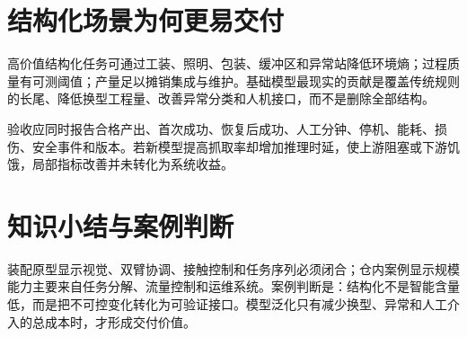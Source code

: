 \section{结构化场景为何更易交付}

高价值结构化任务可通过工装、照明、包装、缓冲区和异常站降低环境熵；过程质量有可测阈值；产量足以摊销集成与维护。基础模型最现实的贡献是覆盖传统规则的长尾、降低换型工程量、改善异常分类和人机接口，而不是删除全部结构。

验收应同时报告合格产出、首次成功、恢复后成功、人工分钟、停机、能耗、损伤、安全事件和版本。若新模型提高抓取率却增加推理时延，使上游阻塞或下游饥饿，局部指标改善并未转化为系统收益。

\section{知识小结与案例判断}

装配原型显示视觉、双臂协调、接触控制和任务序列必须闭合；仓内案例显示规模能力主要来自任务分解、流量控制和运维系统。案例判断是：结构化不是智能含量低，而是把不可控变化转化为可验证接口。模型泛化只有减少换型、异常和人工介入的总成本时，才形成交付价值。
